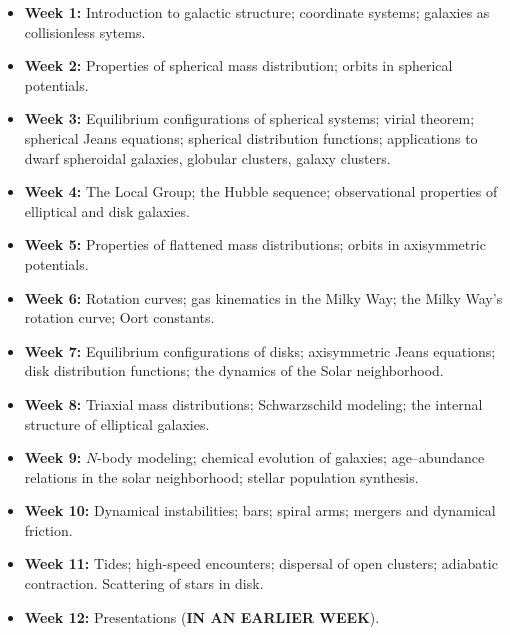 \documentclass{article}
\begin{document}
\begin{itemize}

  \item {\bf Week 1:} Introduction to galactic structure; coordinate
    systems; galaxies as collisionless sytems.

  \item {\bf Week 2:} Properties of spherical mass distribution;
    orbits in spherical potentials.

  \item {\bf Week 3:} Equilibrium configurations of spherical systems;
    virial theorem; spherical Jeans equations; spherical distribution
    functions; applications to dwarf spheroidal galaxies, globular
    clusters, galaxy clusters.

  \item {\bf Week 4:} The Local Group; the Hubble sequence;
    observational properties of elliptical and disk galaxies.

  \item {\bf Week 5:} Properties of flattened mass distributions;
    orbits in axisymmetric potentials.

  \item {\bf Week 6:} Rotation curves; gas kinematics in the Milky
    Way; the Milky Way's rotation curve; Oort constants.

  \item {\bf Week 7:} Equilibrium configurations of disks;
    axisymmetric Jeans equations; disk distribution functions; the
    dynamics of the Solar neighborhood.

  \item {\bf Week 8:} Triaxial mass distributions; Schwarzschild
    modeling; the internal structure of elliptical galaxies.

  \item {\bf Week 9:} $N$-body modeling; chemical evolution of
    galaxies; age--abundance relations in the solar neighborhood;
    stellar population synthesis.

  \item {\bf Week 10:} Dynamical instabilities; bars; spiral arms;
    mergers and dynamical friction.

  \item {\bf Week 11:} Tides; high-speed encounters; dispersal of open
    clusters; adiabatic contraction. Scattering of stars in disk.

  \item {\bf Week 12:} Presentations ({\bf IN AN EARLIER WEEK}).

\end{itemize}
\end{document}
